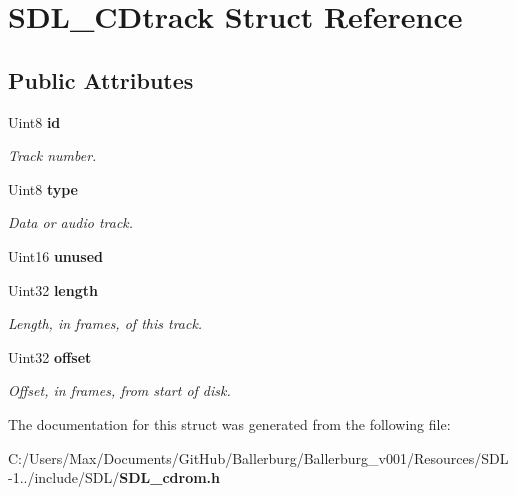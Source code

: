 \section{S\+D\+L\+\_\+\+C\+Dtrack Struct Reference}
\label{struct_s_d_l___c_dtrack}
\subsection*{Public Attributes}
\begin{DoxyCompactItemize}
\item 
Uint8 {\bf id}\label{struct_s_d_l___c_dtrack_aee8f951ef762bef0ab46e7424ad6c6a4}

\begin{DoxyCompactList}\small\item\em Track number. \end{DoxyCompactList}\item 
Uint8 {\bf type}\label{struct_s_d_l___c_dtrack_adc74ef4de78c8418f229e3efd24a076f}

\begin{DoxyCompactList}\small\item\em Data or audio track. \end{DoxyCompactList}\item 
Uint16 {\bfseries unused}\label{struct_s_d_l___c_dtrack_a2ec24a93792ff7a537f7554a89d596cf}

\item 
Uint32 {\bf length}\label{struct_s_d_l___c_dtrack_a15ae81e65a360c3a334e4323af6f2da5}

\begin{DoxyCompactList}\small\item\em Length, in frames, of this track. \end{DoxyCompactList}\item 
Uint32 {\bf offset}\label{struct_s_d_l___c_dtrack_a5c0875650889c529cefee6c2684901f5}

\begin{DoxyCompactList}\small\item\em Offset, in frames, from start of disk. \end{DoxyCompactList}\end{DoxyCompactItemize}


The documentation for this struct was generated from the following file\+:\begin{DoxyCompactItemize}
\item 
C\+:/\+Users/\+Max/\+Documents/\+Git\+Hub/\+Ballerburg/\+Ballerburg\+\_\+v001/\+Resources/\+S\+D\+L-\/1../include/\+S\+D\+L/{\bf S\+D\+L\+\_\+cdrom.\+h}\end{DoxyCompactItemize}
